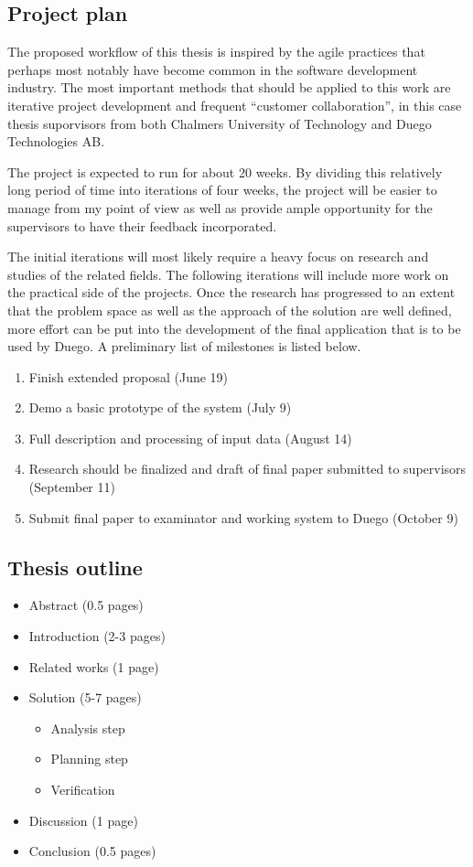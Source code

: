 \documentclass[10pt,twocolumn]{article}
\begin{document}
\subsection{Project plan}
The proposed workflow of this thesis is inspired by the agile practices that perhaps most notably have become common in the software development industry. The most important methods that should be applied to this work are iterative project development and frequent ``customer collaboration'', in this case thesis suporvisors from both Chalmers University of Technology and Duego Technologies AB.

The project is expected to run for about 20 weeks. By dividing this relatively long period of time into iterations of four weeks, the project will be easier to manage from my point of view as well as provide ample opportunity for the supervisors to have their feedback incorporated.

The initial iterations will most likely require a heavy focus on research and studies of the related fields. The following iterations will include more work on the practical side of the projects. Once the research has progressed to an extent that the problem space as well as the approach of the solution are well defined, more effort can be put into the development of the final application that is to be used by Duego. A preliminary list of milestones is listed below.

\begin{enumerate}
	\item Finish extended proposal (June 19)
	\item Demo a basic prototype of the system (July 9)
	\item Full description and processing of input data (August 14)
	\item Research should be finalized and draft of final paper submitted to supervisors (September 11)
	\item Submit final paper to examinator and working system to Duego (October 9)
\end{enumerate}

\subsection{Thesis outline}
\begin{itemize}
	\item Abstract (0.5 pages)
 	\item Introduction (2-3 pages)
 	\item Related works (1 page)
 	\item Solution (5-7 pages)
 	\begin{itemize}
		\item Analysis step
		\item Planning step
		\item Verification
	\end{itemize}
	\item Discussion (1 page)
	\item Conclusion (0.5 pages)
\end{itemize}


\end{document}
